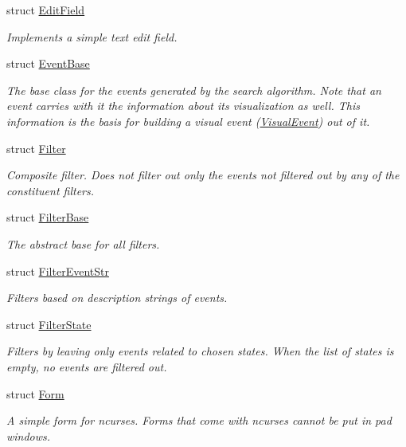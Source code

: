 \begin{DoxyCompactItemize}
struct \hyperlink{structslb_1_1core_1_1ui_1_1EditField}{Edit\+Field}
\begin{DoxyCompactList}\small\item\em Implements a simple text edit field. \end{DoxyCompactList}\item 
struct \hyperlink{structslb_1_1core_1_1ui_1_1EventBase}{Event\+Base}
\begin{DoxyCompactList}\small\item\em The base class for the events generated by the search algorithm. Note that an event carries with it the information about its visualization as well. This information is the basis for building a visual event (\hyperlink{structslb_1_1core_1_1ui_1_1VisualEvent}{Visual\+Event}) out of it. \end{DoxyCompactList}\item 
struct \hyperlink{structslb_1_1core_1_1ui_1_1Filter}{Filter}
\begin{DoxyCompactList}\small\item\em Composite filter. Does not filter out only the events not filtered out by any of the constituent filters. \end{DoxyCompactList}\item 
struct \hyperlink{structslb_1_1core_1_1ui_1_1FilterBase}{Filter\+Base}
\begin{DoxyCompactList}\small\item\em The abstract base for all filters. \end{DoxyCompactList}\item 
struct \hyperlink{structslb_1_1core_1_1ui_1_1FilterEventStr}{Filter\+Event\+Str}
\begin{DoxyCompactList}\small\item\em Filters based on description strings of events. \end{DoxyCompactList}\item 
struct \hyperlink{structslb_1_1core_1_1ui_1_1FilterState}{Filter\+State}
\begin{DoxyCompactList}\small\item\em Filters by leaving only events related to chosen states. When the list of states is empty, no events are filtered out. \end{DoxyCompactList}\item 
struct \hyperlink{structslb_1_1core_1_1ui_1_1Form}{Form}
\begin{DoxyCompactList}\small\item\em A simple form for ncurses. Forms that come with {\ttfamily ncurses} cannot be put in pad windows. \end{DoxyCompactList}\item 

\end{DoxyCompactItemize}
